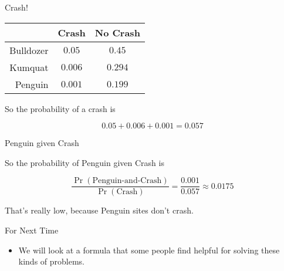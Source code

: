 \documentclass[
  ignorenonframetext,
]{beamer}
\providecommand{\tightlist}{%
  \setlength{\itemsep}{0pt}\setlength{\parskip}{0pt}}
\renewcommand{\,}{\text{, }}
\begin{document}
\begin{frame}{Crash!}
\protect\hypertarget{crash}{}

\begin{longtable}[]{@{}rcc@{}}
\toprule
& Crash & No Crash\tabularnewline
\midrule
\endhead
Bulldozer & \(0.05\) & \(0.45\)\tabularnewline
Kumquat & \(0.006\) & \(0.294\)\tabularnewline
Penguin & \(0.001\) & \(0.199\)\tabularnewline
\bottomrule
\end{longtable}

So the probability of a crash is

\[
0.05 + 0.006 + 0.001 = 0.057
\]

\end{frame}

\begin{frame}{Penguin given Crash}
\protect\hypertarget{penguin-given-crash}{}

So the probability of Penguin given Crash is

\[
\frac{\Pr(\text{Penguin-and-Crash})}{\Pr(\text{Crash})} = \frac{0.001}{0.057} \approx 0.0175
\]

\pause

That's really low, because Penguin sites don't crash.

\end{frame}

\begin{frame}{For Next Time}
\protect\hypertarget{for-next-time}{}

\begin{itemize}
\tightlist
\item
  We will look at a formula that some people find helpful for solving
  these kinds of problems.
\end{itemize}

\end{frame}
\end{document}

